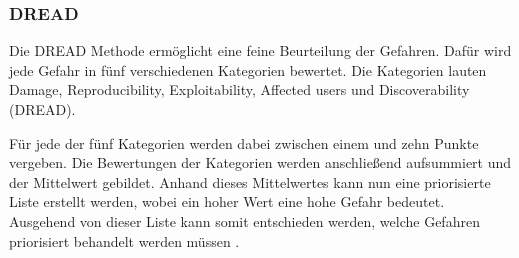 \subsubsection{DREAD}
Die DREAD Methode ermöglicht eine feine Beurteilung der Gefahren.
Dafür wird jede Gefahr in fünf verschiedenen Kategorien bewertet.
Die Kategorien lauten Damage, Reproducibility, Exploitability, Affected users und Discoverability (DREAD).

Für jede der fünf Kategorien werden dabei zwischen einem und zehn Punkte vergeben.
Die Bewertungen der Kategorien werden anschließend aufsummiert und der Mittelwert gebildet.
Anhand dieses Mittelwertes kann nun eine priorisierte Liste erstellt werden, wobei ein hoher Wert eine hohe Gefahr bedeutet.
Ausgehend von dieser Liste kann somit entschieden werden, welche Gefahren priorisiert behandelt werden müssen \autocite[vgl.][]{domars_threat_2023}.
